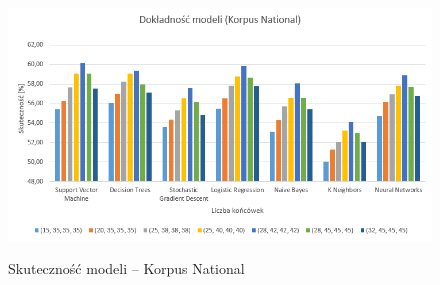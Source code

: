 \begin{figure}[!htbp]
	\centering
	\includegraphics[scale=0.8]{korpusnationalwykres}
	\label{Rysunek}
	\caption{Skuteczność modeli -- Korpus National}
\end{figure}

